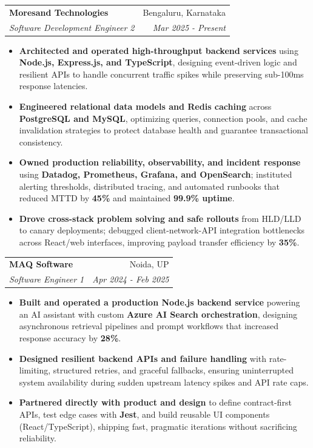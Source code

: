 \documentclass[a4paper,10pt]{article}
\makeatletter
\newcommand{\resumeSubheading}[4]{
  \vspace{-1pt}\item
    \begin{tabular*}{0.97\textwidth}{l@{\extracolsep{\fill}}r}
      \textbf{#1} & #2 \\
      \textit{#3} & \textit{#4} \\
    \end{tabular*}\vspace{-5pt}
}
\newcommand{\resumeItemListStart}{\begin{itemize}}
\newcommand{\resumeItemListEnd}{\end{itemize}\vspace{-5pt}}
\makeatother
\begin{document}
    \resumeSubheading{Moresand Technologies}{Bengaluru, Karnataka}
      {Software Development Engineer 2}{Mar 2025 - Present}
      \resumeItemListStart
        \item \textnormal{\textbf{Architected and operated high-throughput backend services} using \textbf{Node.js, Express.js, and TypeScript}, designing event-driven logic and resilient APIs to handle concurrent traffic spikes while preserving sub-100ms response latencies.}
        \item \textnormal{\textbf{Engineered relational data models and Redis caching} across \textbf{PostgreSQL and MySQL}, optimizing queries, connection pools, and cache invalidation strategies to protect database health and guarantee transactional consistency.}
        \item \textnormal{\textbf{Owned production reliability, observability, and incident response} using \textbf{Datadog, Prometheus, Grafana, and OpenSearch}; instituted alerting thresholds, distributed tracing, and automated runbooks that reduced MTTD by \textbf{45\%} and maintained \textbf{99.9\% uptime}.}
        \item \textnormal{\textbf{Drove cross-stack problem solving and safe rollouts} from HLD/LLD to canary deployments; debugged client-network-API integration bottlenecks across React/web interfaces, improving payload transfer efficiency by \textbf{35\%}.}
      \resumeItemListEnd

    \resumeSubheading{MAQ Software}{Noida, UP}
      {Software Engineer 1}{Apr 2024 - Feb 2025}
      \resumeItemListStart
        \item \textnormal{\textbf{Built and operated a production Node.js backend service} powering an AI assistant with custom \textbf{Azure AI Search orchestration}, designing asynchronous retrieval pipelines and prompt workflows that increased response accuracy by \textbf{28\%}.}
        \item \textnormal{\textbf{Designed resilient backend APIs and failure handling} with rate-limiting, structured retries, and graceful fallbacks, ensuring uninterrupted system availability during sudden upstream latency spikes and API rate caps.}
        \item \textnormal{\textbf{Partnered directly with product and design} to define contract-first APIs, test edge cases with \textbf{Jest}, and build reusable UI components (React/TypeScript), shipping fast, pragmatic iterations without sacrificing reliability.}
      \resumeItemListEnd
\end{document}
